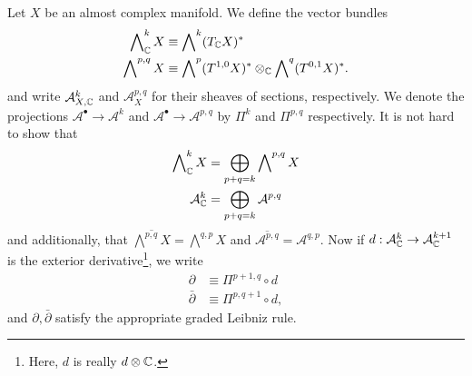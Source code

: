 \documentclass{amsart}
\begin{document}
\begin{definition}
    Let $X$ be an almost complex manifold. We define the vector bundles
    \begin{align*}
        \bigwedge\nolimits^k_{\mathbb{C}} X &\equiv \bigwedge\nolimits^k(T_{\mathbb{C}} X)^*\\
        \bigwedge\nolimits^{p,q}X &\equiv \bigwedge\nolimits^p(T^{1,0}X)^*\otimes_{\mathbb{C}}\bigwedge\nolimits^q(T^{0,1}X)^*.
    \end{align*}
    and write $\mathcal{A}^k_{X,\mathbb{C}}$ and $\mathcal{A}^{p,q}_X$ for their sheaves of sections,
    respectively. We denote the projections $\mathcal{A}^\bullet\to \mathcal{A}^k$ and
    $\mathcal{A}^\bullet\to\mathcal{A}^{p,q}$ by $\Pi^k$ and $\Pi^{p,q}$ respectively. It
    is not hard to show that
    \begin{align*}
        \bigwedge\nolimits^k_{\mathbb{C}} X &= \bigoplus_{p+q=k}\bigwedge\nolimits^{p,q}X\\
        \mathcal{A}^k_{\mathbb{C}} &= \bigoplus_{p+q=k}\mathcal{A}^{p,q}
    \end{align*}
    and additionally, that $\overline{\bigwedge^{p,q}X}=\bigwedge^{q,p}X$ and
    $\overline{\mathcal{A}^{p,q}}=\mathcal{A}^{q,p}$.
    Now if $d:\mathcal{A}^k_{\mathbb{C}}\to\mathcal{A}^{k+1}_{\mathbb{C}}$ is the exterior
    derivative\footnote{Here, $d$ is really $d\otimes\mathbb{C}$.}, we write
    \begin{align*}
        \partial &\equiv \Pi^{p+1,q}\circ d\\
        \bar\partial &\equiv \Pi^{p,q+1}\circ d,
    \end{align*}
    and $\partial,\bar\partial$ satisfy the appropriate graded Leibniz rule.
\end{definition}
\end{document}
